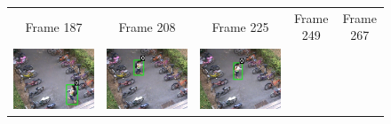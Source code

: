 \begin{figure}[t]
\begin{tabular}{ccccc}
    \small Frame 187 & 
    \small Frame 208 & 
    \small Frame 225 & 
    \small Frame 249 & 
    \small Frame 267 \\
    \includegraphics[scale=0.24]{figures/case-2-suspicious-0188} &
    \includegraphics[scale=0.24]{figures/case-2-suspicious-0334} &
    \includegraphics[scale=0.24]{figures/case-2-suspicious-0344} &

\end{tabular}
\end{figure}
